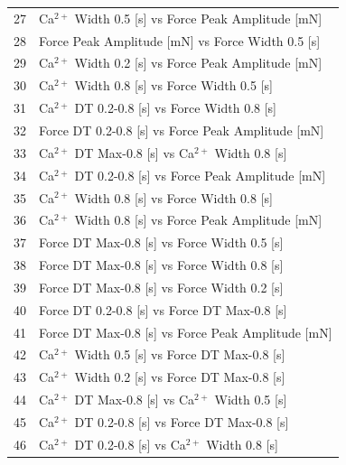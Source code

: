 \documentclass{report}
\begin{document}
\begin{tabular}{@{}ll@{}}
27 & Ca$^{2+}$ Width 0.5 [s] vs Force Peak Amplitude [mN] \\
28 & Force Peak Amplitude [mN] vs Force Width 0.5 [s] \\
29 & Ca$^{2+}$ Width 0.2 [s] vs Force Peak Amplitude [mN] \\
30 & Ca$^{2+}$ Width 0.8 [s] vs Force Width 0.5 [s] \\
31 & Ca$^{2+}$ DT 0.2-0.8 [s] vs Force Width 0.8 [s] \\
32 & Force DT 0.2-0.8 [s] vs Force Peak Amplitude [mN] \\
33 & Ca$^{2+}$ DT Max-0.8 [s] vs Ca$^{2+}$ Width 0.8 [s] \\
34 & Ca$^{2+}$ DT 0.2-0.8 [s] vs Force Peak Amplitude [mN] \\
35 & Ca$^{2+}$ Width 0.8 [s] vs Force Width 0.8 [s] \\
36 & Ca$^{2+}$ Width 0.8 [s] vs Force Peak Amplitude [mN] \\
37 & Force DT Max-0.8 [s] vs Force Width 0.5 [s] \\
38 & Force DT Max-0.8 [s] vs Force Width 0.8 [s] \\
39 & Force DT Max-0.8 [s] vs Force Width 0.2 [s] \\
40 & Force DT 0.2-0.8 [s] vs Force DT Max-0.8 [s] \\
41 & Force DT Max-0.8 [s] vs Force Peak Amplitude [mN] \\
42 & Ca$^{2+}$ Width 0.5 [s] vs Force DT Max-0.8 [s] \\
43 & Ca$^{2+}$ Width 0.2 [s] vs Force DT Max-0.8 [s] \\
44 & Ca$^{2+}$ DT Max-0.8 [s] vs Ca$^{2+}$ Width 0.5 [s] \\
45 & Ca$^{2+}$ DT 0.2-0.8 [s] vs Force DT Max-0.8 [s] \\
46 & Ca$^{2+}$ DT 0.2-0.8 [s] vs Ca$^{2+}$ Width 0.8 [s] \\
\bottomrule
\end{tabular}
\end{document}
